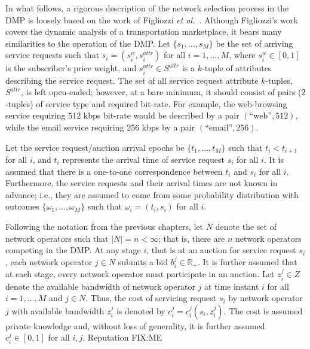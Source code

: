 In what follows, a rigorous description of the network selection process in the DMP is loosely based on the work of Figliozzi \emph{et al.}~\cite{FigliozziJaillet2008}. Although Figliozzi's work covers the dynamic analysis of a transportation marketplace, it bears many similarities to the operation of the DMP. Let $\{s_1,\ldots,s_M\}$ be the set of arriving service requests such that $s_i = (s^w_i, s^{attr}_i)$ for all $i=1,\ldots,M$, where $s^w_i\in [0,1]$ is the subscriber's price weight, and $s^{attr}_i\in S^{attr}$ is a $k$-tuple of attributes describing the service request. The set of all service request attribute $k$-tuples, $S^{attr}$, is left open-ended; however, at a bare minimum, it should consist of pairs ($2$-tuples) of service type and required bit-rate. For example, the web-browsing service requiring $512$ kbps bit-rate would be described by a pair $(\text{``web''}, 512)$, while the email service requiring 256 kbps by a pair $(\text{``email''}, 256)$.

Let the service request/auction arrival epochs be $\{t_1,\ldots,t_M\}$ such that $t_i < t_{i+1}$ for all $i$, and $t_i$ represents the arrival time of service request $s_i$ for all $i$. It is assumed that there is a one-to-one correspondence between $t_i$ and $s_i$ for all $i$. Furthermore, the service requests and their arrival times are not known in advance; i.e., they are assumed to come from some probability distribution with outcomes $\{\omega_1,\ldots,\omega_M\}$ such that $\omega_i = (t_i, s_i)$ for all $i$.

Following the notation from the previous chapters, let $N$ denote the set of network operators such that $|N| = n < \infty$; that is, there are $n$ network operators competing in the DMP. At any stage $i$, that is at an auction for service request $s_i$, each network operator $j\in N$ submits a bid $b^j_i\in\mathbb{R}_+$. It is further assumed that at each stage, every network operator must participate in an auction. Let $z^j_i\in Z$ denote the available bandwidth of network operator $j$ at time instant $i$ for all $i=1,\ldots,M$ and $j\in N$. Thus, the cost of servicing request $s_i$ by network operator $j$ with available bandwidth $z^j_i$ is denoted by $c^j_i = c^j_i(s_i,z^j_i)$. The cost is assumed private knowledge and, without loss of generality, it is further assumed $c^j_i\in [0,1]$ for all $i,j$. Reputation FIX:ME

